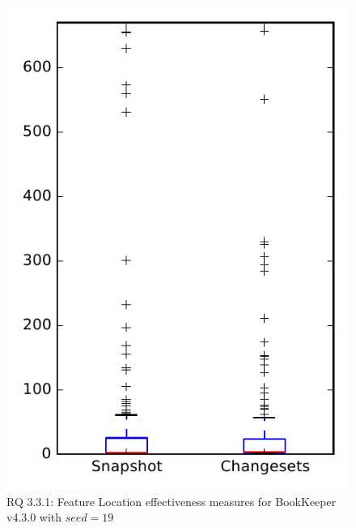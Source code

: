 
\begin{figure}
\centering
\includegraphics[height=0.4\textheight]{figures/flt_seed/rq1_bookkeeper_19}
\caption{RQ 3.3.1: Feature Location effectiveness measures for BookKeeper v4.3.0 with $seed=19$}
\label{fig:flt_seed:rq1:bookkeeper}
\end{figure}
